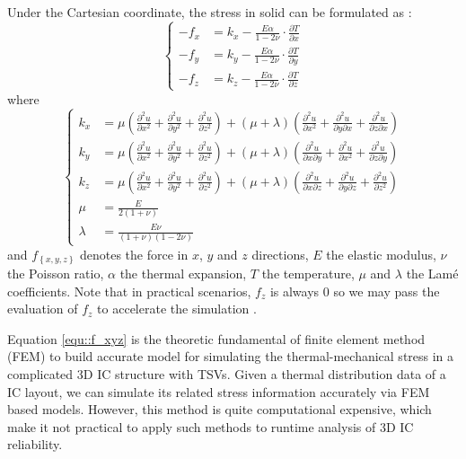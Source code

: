 Under the Cartesian coordinate, the stress in solid can be formulated as \cite{Chen2013Numerical}:
\begin{equation} \label{equ::f_xyz}
\left\{
    \begin{array}{rl}
    -f_x &={} k_x - \frac{E\alpha}{1-2\nu}\cdot\frac{\partial T}{\partial x} \\
    -f_y &={} k_y - \frac{E\alpha}{1-2\nu}\cdot\frac{\partial T}{\partial y} \\
    -f_z &={} k_z - \frac{E\alpha}{1-2\nu}\cdot\frac{\partial T}{\partial z}
    \end{array}
\right.
\end{equation}
where
\begin{equation*}
\left\{
    \begin{array}{rl}
    k_x &= \mu \left( \frac{\partial^2u}{\partial x^2} + \frac{\partial^2u}{\partial y^2} + \frac{\partial^2u}{\partial z^2} \right) 
          + \left( \mu + \lambda \right) \left( \frac{\partial^2u}{\partial x^2} + \frac{\partial^2u}{\partial y \partial x} + \frac{\partial^2u}{\partial z\partial x} \right) \\
    k_y &= \mu \left( \frac{\partial^2u}{\partial x^2} + \frac{\partial^2u}{\partial y^2} + \frac{\partial^2u}{\partial z^2} \right) 
          + \left( \mu + \lambda \right) \left( \frac{\partial^2u}{\partial x \partial y} + \frac{\partial^2u}{\partial x^2} + \frac{\partial^2u}{\partial z\partial y} \right) \\
    k_z &= \mu \left( \frac{\partial^2u}{\partial x^2} + \frac{\partial^2u}{\partial y^2} + \frac{\partial^2u}{\partial z^2} \right) 
          + \left( \mu + \lambda \right) \left( \frac{\partial^2u}{\partial x \partial z} + \frac{\partial^2u}{\partial y \partial z} + \frac{\partial^2u}{\partial z^2} \right) \\
    \mu &= \frac{E}{2(1+\nu)} \\
    \lambda &= \frac{E\nu}{(1+\nu)(1-2\nu)}
    \end{array}
\right.
\end{equation*}
and $f_{\left\{ x,y,z \right\}}$ denotes the force in $x$, $y$ and $z$ directions, $E$ the elastic
modulus, $\nu$ the Poisson ratio, $\alpha$ the thermal expansion, $T$ the temperature, $\mu$ and
$\lambda$ the Lam\'e coefficients. Note that in practical scenarios, $f_z$ is always $0$ so we may
pass the evaluation of $f_z$ to accelerate the simulation \cite{Marella2015A}.

Equation \eqref{equ::f_xyz} is the theoretic fundamental of finite element method (FEM) to build accurate model for simulating the
thermal-mechanical stress in a complicated 3D IC structure with TSVs. Given a thermal distribution
data of a IC layout, we can simulate its related stress information accurately via FEM based models.
However, this method is quite computational expensive, which make it not practical to apply
such methods to runtime analysis of 3D IC reliability.

